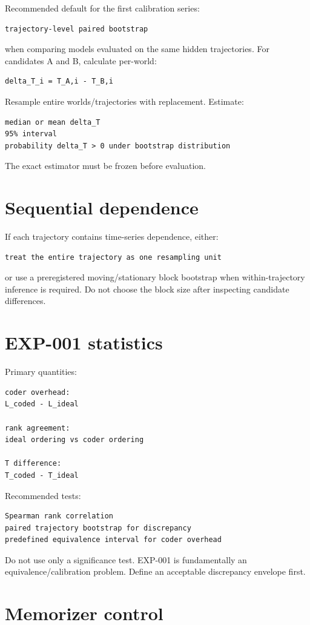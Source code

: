 \documentclass[11pt]{article}
\begin{document}
Recommended default for the first calibration series:
\begin{verbatim}
trajectory-level paired bootstrap
\end{verbatim}
when comparing models evaluated on the same hidden trajectories. For candidates A and B, calculate per-world:
\begin{verbatim}
delta_T_i = T_A,i - T_B,i
\end{verbatim}
Resample entire worlds/trajectories with replacement. Estimate:
\begin{verbatim}
median or mean delta_T
95% interval
probability delta_T > 0 under bootstrap distribution
\end{verbatim}
The exact estimator must be frozen before evaluation.

\section{Sequential dependence}

If each trajectory contains time-series dependence, either:
\begin{verbatim}
treat the entire trajectory as one resampling unit
\end{verbatim}
or use a preregistered moving/stationary block bootstrap when within-trajectory inference is required. Do not choose the block size after inspecting candidate differences.

\section{EXP-001 statistics}

Primary quantities:
\begin{verbatim}
coder overhead:
L_coded - L_ideal

rank agreement:
ideal ordering vs coder ordering

T difference:
T_coded - T_ideal
\end{verbatim}
Recommended tests:
\begin{verbatim}
Spearman rank correlation
paired trajectory bootstrap for discrepancy
predefined equivalence interval for coder overhead
\end{verbatim}
Do not use only a significance test. EXP-001 is fundamentally an equivalence/calibration problem. Define an acceptable discrepancy envelope first.

\section{Memorizer control}
\end{document}
